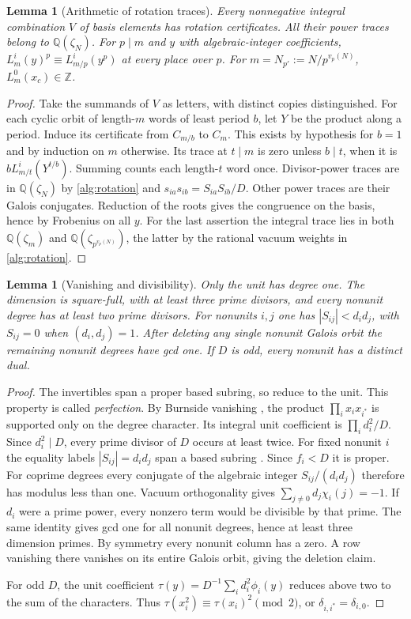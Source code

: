 \documentclass[11pt]{amsart}
\numberwithin{equation}{section}
\newtheorem{lemma}[theorem]{Lemma}
\theoremstyle{definition}
\theoremstyle{plain}
\newcommand{\QQ}{\mathbb Q}
\newcommand{\ZZ}{\mathbb Z}
\begin{document}
\begin{lemma}[Arithmetic of rotation traces]\label{alg:rotation-arithmetic}
Every nonnegative integral combination $V$ of basis elements has
rotation certificates. All their power traces belong to $\QQ(\zeta_N)$.
For $p\mid m$ and $y$ with algebraic-integer coefficients,
$L_m^i(y)^p\equiv L_{m/p}^i(y^p)$ at every place over $p$.
For $m=N_{p'}:=N/p^{v_p(N)}$, $L_m^0(x_c)\in\ZZ$.
\end{lemma}
\begin{proof}
Take the summands of $V$ as letters, with distinct copies distinguished.
For each cyclic orbit of length-$m$ words of least period $b$, let $Y$
be the product along a period. Induce its certificate from $C_{m/b}$
to $C_m$. This exists by hypothesis for $b=1$ and by induction on $m$
otherwise. Its trace at $t\mid m$ is zero unless $b\mid t$, when it is
$bL_{m/t}^i(Y^{t/b})$. Summing counts each length-$t$ word once.
Divisor-power traces are in $\QQ(\zeta_N)$ by \eqref{alg:rotation}
and $s_{ia}s_{ib}=S_{ia}S_{ib}/D$. Other power traces are their
Galois conjugates. Reduction of the roots gives the congruence on the
basis, hence by Frobenius on all $y$. For the last assertion the
integral trace lies in both $\QQ(\zeta_m)$ and $\QQ(\zeta_{p^{v_p(N)}})$,
the latter by the rational vacuum weights in \eqref{alg:rotation}.
\end{proof}

\begin{lemma}[Vanishing and divisibility]\label{lem:basic-table}
Only the unit has degree one. The dimension is square-full, with
at least three prime divisors, and every nonunit degree has at least
two prime divisors. For nonunits $i,j$ one has $|S_{ij}|<d_id_j$,
with $S_{ij}=0$ when $(d_i,d_j)=1$. After deleting any single nonunit
Galois orbit the remaining nonunit degrees have gcd one.
If $D$ is odd, every nonunit has a distinct dual.
\end{lemma}
\begin{proof}
The invertibles span a proper based subring, so reduce to the unit.
This property is called \emph{perfection}. By Burnside vanishing \cite[Theorem~1.2]{BPBurnside}, the product
$\prod_i x_i x_{i^*}$ is supported only on the degree character.
Its integral unit coefficient is $\prod_i d_i^2/D$. Since $d_i^2\mid D$,
every prime divisor of $D$ occurs at least twice. For fixed nonunit $i$ the equality
labels $|S_{ij}|=d_id_j$ span a based subring
\cite[Lemma~2.35]{BPBurnside}. Since $f_i<D$ it is proper.
For coprime degrees every conjugate of the algebraic integer
$S_{ij}/(d_id_j)$ therefore has modulus less than one. Vacuum
orthogonality gives $\sum_{j\ne0}d_j\chi_i(j)=-1$. If $d_i$ were a
prime power, every nonzero term would be divisible by that prime.
The same identity gives gcd one for all nonunit degrees, hence at
least three dimension primes. By symmetry every nonunit column has a zero. A row vanishing
there vanishes on its entire Galois orbit, giving the deletion claim.

For odd $D$, the unit coefficient
$\tau(y)=D^{-1}\sum_i d_i^2\phi_i(y)$ reduces above two to the sum
of the characters. Thus $\tau(x_i^2)\equiv\tau(x_i)^2\pmod2$,
or $\delta_{i,i^*}=\delta_{i,0}$.
\end{proof}
\end{document}
